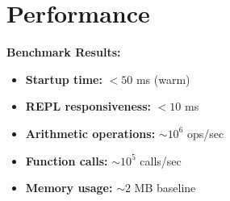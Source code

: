 \section{Performance}

\begin{tcolorbox}[colback=softviolet!20, colframe=softvioletdark, sharp corners]
\textbf{\textcolor{darkpurple}{Benchmark Results:}}
\begin{itemize}
    \item \textbf{Startup time:} $< 50$ ms (warm)
    \item \textbf{REPL responsiveness:} $< 10$ ms
    \item \textbf{Arithmetic operations:} $\sim 10^6$ ops/sec
    \item \textbf{Function calls:} $\sim 10^5$ calls/sec
    \item \textbf{Memory usage:} $\sim 2$ MB baseline
\end{itemize}
\end{tcolorbox}
